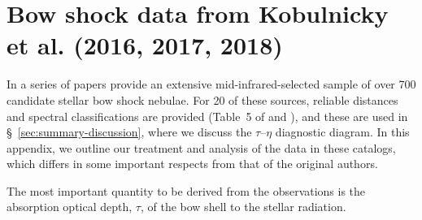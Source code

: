 \section{Bow shock data from Kobulnicky et al. (2016, 2017, 2018)}
\label{app:bow-shock-data}

In a series of papers \citet{Kobulnicky:2016a, Kobulnicky:2017a,
  Kobulnicky:2018a} provide an extensive mid-infrared-selected sample
of over 700 candidate stellar bow shock nebulae.  For 20 of these
sources, reliable distances and spectral classifications are provided
(Table~5 of \citealp{Kobulnicky:2017a} and 
\citealp{Kobulnicky:2018a}), and these are used in
\S~\ref{sec:summary-discussion}, where we discuss the
\(\tau\)--\(\eta\) diagnostic diagram.  In this appendix, we outline our
treatment and analysis of the data in these catalogs, which differs in
some important respects from that of the original authors.

The most important quantity to be derived from the observations is the
absorption optical depth, \(\tau\), of the bow shell to the stellar radiation.


